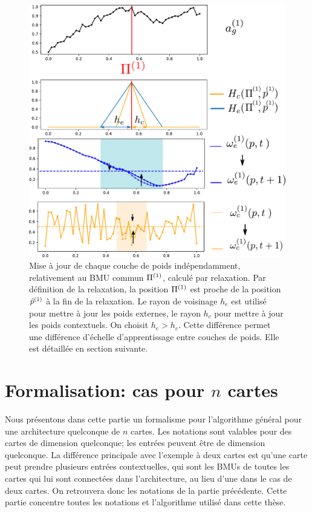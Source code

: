 \begin{figure}
\begin{minipage}[c]{0.6\textwidth}
\includegraphics[width=\textwidth]{maj_2som.pdf}
\end{minipage}
\hfill
\begin{minipage}[c]{0.35\textwidth}
\caption{Mise à jour de chaque couche de poids indépendamment, relativement au BMU commun $\Pi^{({1})}$, calculé par relaxation. Par définition de la relaxation, la position $\Pi^{({1})}$ est proche de la position $\hat{p}^{({1})}$ à la fin de la relaxation. Le rayon de voisinage $h_e$ est utilisé pour mettre à jour les poids externes, le rayon $h_c$ pour mettre à jour les poids contextuels. On choisit $h_e > h_c$. Cette différence permet une différence d'échelle d'apprentissage entre couches de poids. Elle est détaillée en section suivante.\label{fig:maj}}
\end{minipage}

\end{figure}


\section{Formalisation: cas pour $n$ cartes}\label{sec:formalisme}

Nous présentons dans cette partie un formalisme pour l'algorithme général pour une architecture quelconque de $n$ cartes. Les notations sont valables pour des cartes de dimension quelconque; les entrées peuvent être de dimension quelconque.
La différence principale avec l'exemple à deux cartes est qu'une carte peut prendre plusieurs entrées contextuelles, qui sont les BMUs de toutes les cartes qui lui sont connectées dans l'architecture, au lieu d'une dans le cas de deux cartes. On retrouvera donc les notations de la partie précédente.
Cette partie concentre toutes les notations et l'algorithme utilisé dans cette thèse. 

